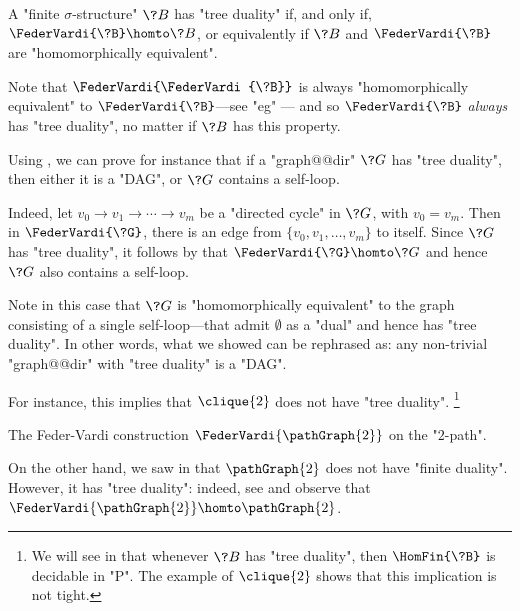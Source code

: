 \begin{proposition}
	\label{prop:charac-Feder-Vardi}
	A "finite $\sigma$-structure" $\?B$ has "tree duality" if, and only if,
	$\FederVardi{\?B} \homto \?B$, or equivalently if $\?B$ and $\FederVardi{\?B}$
	are "homomorphically equivalent".
\end{proposition}

Note that $\FederVardi{\FederVardi{\?B}}$ is always "homomorphically equivalent" to
$\FederVardi{\?B}$---see "eg" \cite[\S~9.2.2, Proposition 9.1]{NesetrilPOM2012FirstOrderCSPs}---
and so $\FederVardi{\?B}$ \emph{always} has "tree duality", no matter if $\?B$ has this property.

\begin{example}
	\label{ex:Feder-Vardi-P2}
	Using , we can prove for instance that
	if a "graph@@dir" $\?G$ has "tree duality", then either it is a "DAG", or $\?G$ contains
	a self-loop.

	Indeed, let $v_0 \to v_1 \to \cdots \to v_m$ be a "directed cycle" in $\?G$,
	with $v_0 = v_m$. Then in $\FederVardi{\?G}$, there is an edge from
	$\{v_0,v_1,\hdots,v_m\}$ to itself.
	Since $\?G$ has "tree duality", it follows by 
	that $\FederVardi{\?G} \homto \?G$ and hence $\?G$ also contains a self-loop.
	
	Note in this case that $\?G$ is "homomorphically equivalent" to the graph consisting
	of a single self-loop---that admit $\emptyset$ as a "dual" and hence has
	"tree duality". In other words, what we showed can be rephrased as: any
	non-trivial "graph@@dir" with "tree duality" is a "DAG".

	For instance, this implies that $\clique{2}$ does not have
	"tree duality".%
	\footnote{We will see in 
	that whenever $\?B$ has "tree duality", then $\HomFin{\?B}$ is decidable in "P".
	The example of $\clique{2}$ shows that this implication is not tight.}
	
	\begin{marginfigure}
		\centering
		\begin{tikzpicture}
			
		\end{tikzpicture}
		\caption{
			\AP\label{fig:P2-Feder-Vardi}
			The Feder-Vardi construction $\FederVardi{\pathGraph{2}}$
			on the "$2$-path".
		}
	\end{marginfigure}
	On the other hand, we saw in  that $\pathGraph{2}$ does not have
	"finite duality". However, it has "tree duality": indeed, see 
	and observe that $\FederVardi{\pathGraph{2}} \homto \pathGraph{2}$.
\end{example}